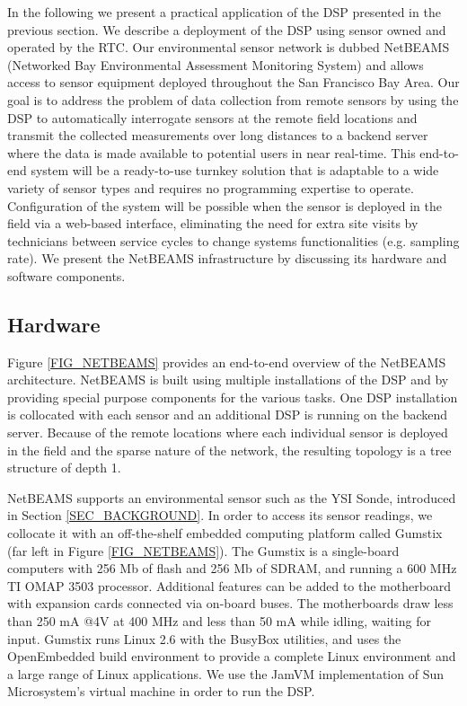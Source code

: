 \documentclass[conference]{IEEEtran}
\begin{document}
In the following we present a practical application of the DSP
presented in the previous section. We describe a deployment of the DSP
using sensor owned and operated by the RTC. Our environmental sensor
network is dubbed NetBEAMS (Networked Bay Environmental Assessment
Monitoring System) and allows access to sensor equipment deployed
throughout the San Francisco Bay Area.  Our goal is to address the
problem of data collection from remote sensors by using the DSP to
automatically interrogate sensors at the remote field locations and
transmit the collected measurements over long distances to a backend
server where the data is made available to potential users in near
real-time. This end-to-end system will be a ready-to-use turnkey
solution that is adaptable to a wide variety of sensor types and
requires no programming expertise to operate. Configuration of the
system will be possible when the sensor is deployed in the field via a
web-based interface, eliminating the need for extra site visits by
technicians between service cycles to change systems functionalities
(e.g. sampling rate). We present the NetBEAMS infrastructure by
discussing its hardware and software components.



\subsection{Hardware}

Figure \ref{FIG_NETBEAMS} provides an end-to-end overview of the
NetBEAMS architecture. NetBEAMS is built using multiple installations
of the DSP and by providing special purpose components for the various
tasks. One DSP installation is collocated with each sensor and an
additional DSP is running on the backend server. Because of the remote
locations where each individual sensor is deployed in the field and
the sparse nature of the network, the resulting topology is a tree
structure of depth 1.


\begin{figure*}
\centering
{}
\caption{\label{FIG_NETBEAMS} NetBEAMS architecture.}
\end{figure*}

NetBEAMS supports an environmental sensor such as the YSI Sonde,
introduced in Section \ref{SEC_BACKGROUND}. In order to access its
sensor readings, we collocate it with an off-the-shelf embedded
computing platform called Gumstix \cite{gumstix01} (far left in Figure
\ref{FIG_NETBEAMS}). The Gumstix is a single-board computers with 256
Mb of flash and 256 Mb of SDRAM, and running a 600 MHz TI OMAP 3503
processor. Additional features can be added to the motherboard with
expansion cards connected via on-board buses. The motherboards draw
less than 250 mA @4V at 400 MHz and less than 50 mA while idling,
waiting for input.  Gumstix runs Linux 2.6 with the BusyBox utilities,
and uses the OpenEmbedded build environment to provide a complete Linux
environment and a large range of Linux applications. We use the JamVM
\cite{jamvm01} implementation of Sun Microsystem's virtual machine in order to
run the DSP.
\end{document}

